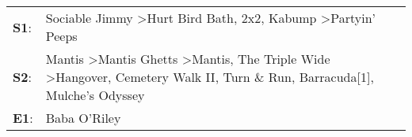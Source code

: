 \begin{supertabular}{p{0.03\textwidth}p{0.92\textwidth}}
 \textbf{S1}:  &                                                                                                                                                                                      Sociable Jimmy\textsuperscript{} \textgreater \enspace Hurt Bird Bath\textsuperscript{}, \enspace 2x2\textsuperscript{}, \enspace Kabump\textsuperscript{} \textgreater \enspace Partyin' Peeps\textsuperscript{}  \enspace  \\
 \textbf{S2}:  &  Mantis\textsuperscript{} \textgreater \enspace Mantis Ghetts\textsuperscript{} \textgreater \enspace Mantis\textsuperscript{}, \enspace The Triple Wide\textsuperscript{} \textgreater \enspace Hangover\textsuperscript{}, \enspace Cemetery Walk II\textsuperscript{}, \enspace Turn \& Run\textsuperscript{}, \enspace Barracuda[1]\textsuperscript{}, \enspace Mulche's Odyssey\textsuperscript{}  \enspace  \\
 \textbf{E1}:  &                                                                                                                                                                                                                                                                                                                                                                         Baba O'Riley\textsuperscript{}  \enspace  \\
\end{supertabular}
